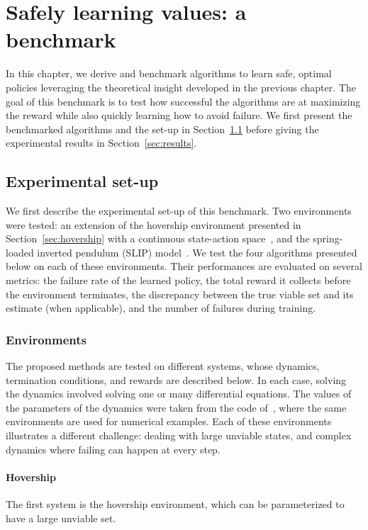 \chapter{Safely learning values: a benchmark} \label{chap:benchmark}
In this chapter, we derive and benchmark algorithms to learn safe, optimal policies leveraging the theoretical insight developed in the previous chapter. The goal of this benchmark is to test how successful the algorithms are at maximizing the reward while also quickly learning how to avoid failure. We first present the benchmarked algorithms and the set-up in Section~\ref{sec:set-up} before giving the experimental results in Section~\ref{sec:results}.

\section{Experimental set-up} \label{sec:set-up}
We first describe the experimental set-up of this benchmark. Two environments were tested: an extension of the hovership environment presented in Section~\ref{sec:hovership} with a continuous state-action space~\cite{heim2020learnable}, and the spring-loaded inverted pendulum (SLIP) model~\cite{heim2019beyond}. We test the four algorithms presented below on each of these environments. Their performances are evaluated on several metrics: the failure rate of the learned policy, the total reward it collects before the environment terminates, the discrepancy between the true viable set and its estimate (when applicable), and the number of failures during training.

\subsection{Environments}
The proposed methods are tested on different systems, whose dynamics, termination conditions, and rewards are described below. In each case, solving the dynamics involved solving one or many differential equations. The values of the parameters of the dynamics were taken from the code of~\textcite{heim2020learnable}, where the same environments are used for numerical examples. Each of these environments illustrates a different challenge: dealing with large unviable states, and complex dynamics where failing can happen at every step.

\subsubsection{Hovership}
The first system is the hovership environment, which can be parameterized to have a large unviable set.

